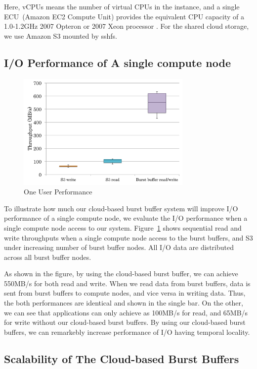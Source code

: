 Here, vCPUs means the number of virtual CPUs in the instance, 
and a single ECU~(Amazon EC2 Compute Unit) provides the equivalent CPU capacity
of a 1.0-1.2GHz 2007 Opteron or 2007 Xeon processor \cite{AMAZON_AWS}.
For the shared cloud storage, we use Amazon S3 mounted by sshfs\cite{sshfs}.

\subsection{I/O Performance of A single compute node}

\begin{figure}
\centering
\includegraphics[width=8.5cm]{img/one_client-2.pdf}
\caption{One User Performance}
\label{evaluation:one user performance}
\end{figure}
To illustrate how much our cloud-based burst buffer system will improve I/O
performance of a single compute node, we evaluate the I/O performance when a
single compute node access to our system.
Figure~\ref{evaluation:one user performance} shows sequential read and write
throughputs when a single compute node access to the burst buffers, and S3
under increasing number of burst buffer nodes. All I/O data are distributed
across all burst buffer nodes.

As shown in the figure, by using the cloud-based burst buffer, we can 
achieve 550MB/s for both read and write.
When we read data from burst buffers, data is sent from burst buffers to compute
nodes, and vice versa in writing data. Thus, the both performances are identical
and shown in the single bar. On the other, we can see that applications
can only achieve as 100MB/s for read, and 65MB/s for write without our
cloud-based burst buffers. By using our cloud-based burst buffers, 
we can remarkebly increase performance of I/O having temporal
locality.

\subsection{Scalability of The Cloud-based Burst Buffers}

